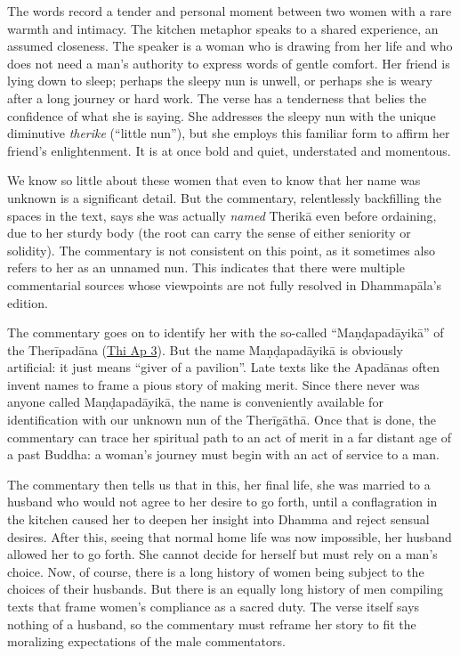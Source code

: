 \documentclass[12pt,openany]{book}%
\begin{document}
The words record a tender and personal moment between two women with a rare warmth and intimacy. The kitchen metaphor speaks to a shared experience, an assumed closeness. The speaker is a woman who is drawing from her life and who does not need a man’s authority to express words of gentle comfort. Her friend is lying down to sleep; perhaps the sleepy nun is unwell, or perhaps she is weary after a long journey or hard work. The verse has a tenderness that belies the confidence of what she is saying. She addresses the sleepy nun with the unique diminutive \textit{therike} (“little nun”), but she employs this familiar form to affirm her friend’s enlightenment. It is at once bold and quiet, understated and momentous.

We know so little about these women that even to know that her name was unknown is a significant detail. But the commentary, relentlessly backfilling the spaces in the text, says she was actually \emph{named} \textsanskrit{Therikā} even before ordaining, due to her sturdy body (the root can carry the sense of either seniority or solidity). The commentary is not consistent on this point, as it sometimes also refers to her as an unnamed nun. This indicates that there were multiple commentarial sources whose viewpoints are not fully resolved in \textsanskrit{Dhammapāla}’s edition.

The commentary goes on to identify her with the so-called “\textsanskrit{Maṇḍapadāyikā}” of the \textsanskrit{Therīpadāna} (\href{https://suttacentral.net/thi{-}ap3}{Thi Ap 3}). But the name \textsanskrit{Maṇḍapadāyikā} is obviously artificial: it just means “giver of a pavilion”. Late texts like the \textsanskrit{Apadānas} often invent names to frame a pious story of making merit. Since there never was anyone called \textsanskrit{Maṇḍapadāyikā}, the name is conveniently available for identification with our unknown nun of the \textsanskrit{Therīgāthā}. Once that is done, the commentary can trace her spiritual path to an act of merit in a far distant age of a past Buddha: a woman’s journey must begin with an act of service to a man.

The commentary then tells us that in this, her final life, she was married to a husband who would not agree to her desire to go forth, until a conflagration in the kitchen caused her to deepen her insight into Dhamma and reject sensual desires. After this, seeing that normal home life was now impossible, her husband allowed her to go forth. She cannot decide for herself but must rely on a man’s choice. Now, of course, there is a long history of women being subject to the choices of their husbands. But there is an equally long history of men compiling texts that frame women’s compliance as a sacred duty. The verse itself says nothing of a husband, so the commentary must reframe her story to fit the moralizing expectations of the male commentators.
\end{document}
